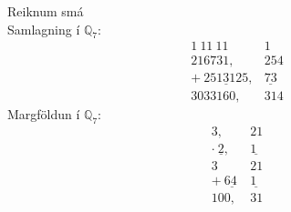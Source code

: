 \begin{daemi}
Reiknum smá \\
Samlagning í $\mathbb{Q}_7$:\\
\begin{align*}
1\ 11\ 11\ &1 \\
 216731,&254 \\
+\ \underline{2513125},&\underline{73} \\
3033160,&314
\end{align*}
Margföldun í $\mathbb{Q}_7$:\\
\begin{align*}
 3,&21 \\
\cdot \ \underline{2},&\underline{1 \ \ } \\
3\ &21 \\
+ \ \underline{64\ }&\underline{1 \ \ } \\
100,&31
\end{align*}

\end{daemi}

